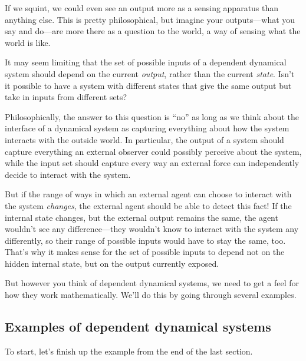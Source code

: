 \documentclass[Book-Poly]{subfiles}
\begin{document}

If we squint, we could even see an output more as a sensing apparatus than anything else. This is pretty philosophical, but imagine your outputs---what you say and do---are more there as a question to the world, a way of sensing what the world is like.

\begin{remark}
It may seem limiting that the set of possible inputs of a dependent dynamical system should depend on the current \emph{output}, rather than the current \emph{state}.
Isn't it possible to have a system with different states that give the same output but take in inputs from different sets?

Philosophically, the answer to this question is ``no'' as long as we think about the interface of a dynamical system as capturing everything about how the system interacts with the outside world.
In particular, the output of a system should capture everything an external observer could possibly perceive about the system, while the input set should capture every way an external force can independently decide to interact with the system.

But if the range of ways in which an external agent can choose to interact with the system \emph{changes}, the external agent should be able to detect this fact!
If the internal state changes, but the external output remains the same, the agent wouldn't see any difference---they wouldn't know to interact with the system any differently, so their range of possible inputs would have to stay the same, too.
That's why it makes sense for the set of possible inputs to depend not on the hidden internal state, but on the output currently exposed.
\end{remark}

But however you think of dependent dynamical systems, we need to get a feel for how they work mathematically.
We'll do this by going through several examples.

\subsection{Examples of dependent dynamical systems}
To start, let's finish up the example from the end of the last section.
\end{document}
